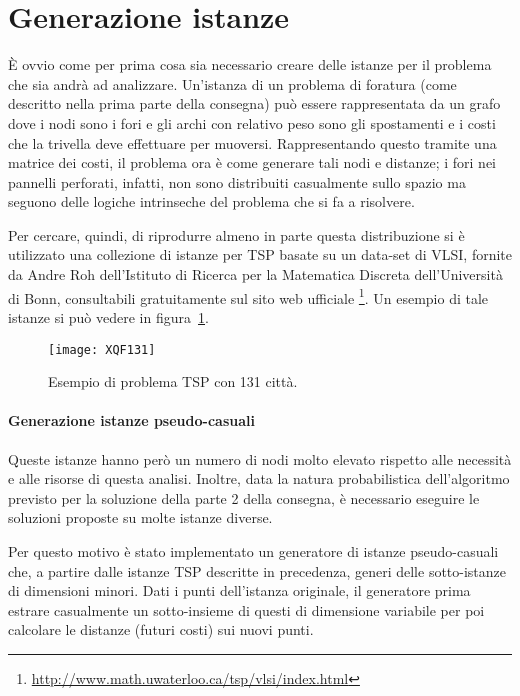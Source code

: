 
\section{Generazione istanze}\label{sec:generazione-istanze}
È ovvio come per prima cosa sia necessario creare delle istanze per il problema che sia andrà ad analizzare.
Un'istanza di un problema di foratura (come descritto nella prima parte della consegna) può essere rappresentata
da un grafo dove i nodi sono i fori e gli archi con relativo peso sono gli spostamenti e i costi che la trivella
deve effettuare per muoversi.
Rappresentando questo tramite una matrice dei costi, il problema ora è come generare tali nodi e distanze;
i fori nei pannelli perforati, infatti, non sono distribuiti casualmente sullo spazio ma seguono delle
logiche intrinseche del problema che si fa a risolvere.

Per cercare, quindi, di riprodurre almeno in parte questa distribuzione si è utilizzato una collezione di istanze
per TSP basate su un data-set di VLSI, fornite da Andre Roh dell'Istituto di Ricerca per la Matematica Discreta
dell'Università di Bonn, consultabili gratuitamente sul sito web ufficiale
\footnote{\url{http://www.math.uwaterloo.ca/tsp/vlsi/index.html}}.
Un esempio di tale istanze si può vedere in figura~\ref{fig:istanza-tsp-XQF131}.
%
\begin{figure}[!h]
\begin{center}
	\texttt{[image: XQF131]}
{\scriptsize \caption{Esempio di problema TSP con 131 città.}
\label{fig:istanza-tsp-XQF131}}
\end{center}
\end{figure}
%
\paragraph{Generazione istanze pseudo-casuali}
Queste istanze hanno però un numero di nodi molto elevato rispetto alle necessità
e alle risorse di questa analisi.
Inoltre, data la natura probabilistica dell'algoritmo previsto per la soluzione della parte 2 della consegna,
è necessario eseguire le soluzioni proposte su molte istanze diverse.

Per questo motivo è stato implementato un generatore di istanze pseudo-casuali che, a partire dalle istanze TSP
descritte in precedenza, generi delle sotto-istanze di dimensioni minori.
Dati i punti dell'istanza originale, il generatore prima estrare casualmente un sotto-insieme di questi
di dimensione variabile per poi calcolare le distanze (futuri costi) sui nuovi punti.

